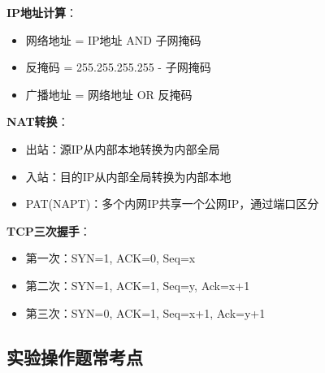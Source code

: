 \documentclass[12pt,a4paper]{ctexart}
\begin{document}
\begin{keybox}
\textbf{IP地址计算}：
\begin{itemize}[itemsep=0pt]
    \item 网络地址 = IP地址 AND 子网掩码
    \item 反掩码 = 255.255.255.255 - 子网掩码
    \item 广播地址 = 网络地址 OR 反掩码
\end{itemize}

\textbf{NAT转换}：
\begin{itemize}[itemsep=0pt]
    \item 出站：源IP从内部本地转换为内部全局
    \item 入站：目的IP从内部全局转换为内部本地
    \item PAT(NAPT)：多个内网IP共享一个公网IP，通过端口区分
\end{itemize}

\textbf{TCP三次握手}：
\begin{itemize}[itemsep=0pt]
    \item 第一次：SYN=1, ACK=0, Seq=x
    \item 第二次：SYN=1, ACK=1, Seq=y, Ack=x+1
    \item 第三次：SYN=0, ACK=1, Seq=x+1, Ack=y+1
\end{itemize}
\end{keybox}

\subsection{实验操作题常考点}
\end{document}
